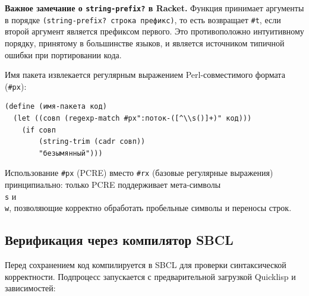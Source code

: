 \documentclass[11pt,a4paper]{article}
\begin{document}
\begin{conceptbox}
\textbf{Важное замечание о \texttt{string-prefix?} в Racket.}
Функция принимает аргументы в порядке \texttt{(string-prefix?~строка~префикс)},
то есть возвращает \texttt{\#t}, если второй аргумент является префиксом первого.
Это противоположно интуитивному порядку, принятому в большинстве языков, и
является источником типичной ошибки при портировании кода.
\end{conceptbox}

Имя пакета извлекается регулярным выражением Perl-совместимого формата (\texttt{\#px}):

\begin{lstlisting}[language=Racket, caption={Извлечение имени пакета}]
(define (имя-пакета код)
  (let ((совп (regexp-match #px":поток-([^\\s()]+)" код)))
    (if совп
        (string-trim (cadr совп))
        "безымянный")))
\end{lstlisting}

Использование \texttt{\#px} (PCRE) вместо \texttt{\#rx} (базовые регулярные выражения)
принципиально: только PCRE поддерживает мета-символы \texttt{\\s} и \texttt{\\w},
позволяющие корректно обработать пробельные символы и переносы строк.

\subsection{Верификация через компилятор SBCL}

Перед сохранением код компилируется в SBCL для проверки синтаксической корректности.
Подпроцесс запускается с предварительной загрузкой Quicklisp и зависимостей:
\end{document}
